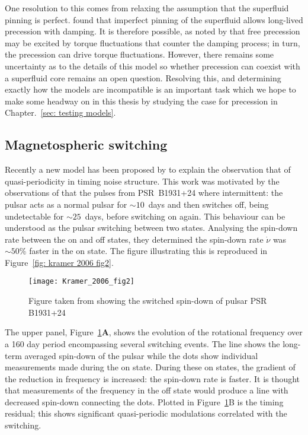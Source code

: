 One resolution to this comes from relaxing the assumption that the superfluid
pinning is perfect. \citet{Sedrakian1999} found that imperfect pinning of the
superfluid allows long-lived precession with damping. It is therefore possible,
as noted by \citet{Cordes1993} that free precession may be excited by torque
fluctuations that counter the damping process; in turn, the precession can
drive torque fluctuations. However, there remains some uncertainty as to the
details of this model so whether precession can coexist with a superfluid core
remains an open question. Resolving this, and determining exactly how the
models are incompatible is an important task which we hope to make some headway
on in this thesis by studying the case for precession in Chapter.~\ref{sec:
testing models}.


\subsection{Magnetospheric switching}
\label{sec: two state switching}

Recently a new model has been proposed by \citet{Lyne2010} to explain the
observation that of quasi-periodicity in timing noise structure.
This work was motivated by the observations of \citet{Kramer2006} that the
pulses from PSR~B1931+24 where intermittent: the pulsar acts as a normal pulsar
for $\sim10$~days and then switches off, being undetectable for $\sim25$~days,
before switching on again. This behaviour can be understood as the pulsar switching
between two states. Analysing the spin-down rate between the on and off
states, they determined the spin-down rate $\dot{\nu}$ was $\sim50\%$ faster in
the on state. The figure illustrating this is reproduced in Figure~\ref{fig:
kramer 2006 fig2}.
\begin{figure}
    \centering
    \texttt{[image: Kramer\_2006\_fig2]}
    \caption{Figure taken from \citet{Kramer2006} showing the switched spin-down
             of pulsar PSR B1931+24}
    \label{fig: kramer 2006 fig2}
\end{figure}
The  upper panel, Figure~\ref{fig: kramer 2006 fig2}\textbf{A}, shows the
evolution of the rotational frequency over a 160 day period encompassing
several switching events. The line shows the long-term averaged spin-down of
the pulsar while the dots show individual measurements made during the on
state. During these on states, the gradient of the reduction in frequency is
increased: the spin-down rate is faster.  It is thought that measurements of
the frequency in the off state would produce a line with decreased spin-down
connecting the dots. Plotted in Figure~\ref{fig: kramer 2006 fig2}\textrm{B} is
the timing residual; this shows significant quasi-periodic modulations
correlated with the switching.

